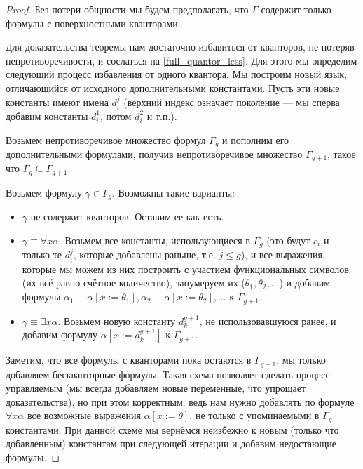\begin{proof}
Без потери общности мы будем предполагать, что $\Gamma$ содержит
только формулы с поверхностными кванторами.

Для доказательства теоремы нам достаточно 
избавиться от кванторов, не потеряв непротиворечивости, и сослаться на
\ref{full_quantor_less}. Для этого мы определим следующий процесс
избавления от одного квантора.
Мы построим новый язык, отличающийся от исходного дополнительными 
константами. Пусть эти новые константы имеют имена $d_i^j$
(верхний индекс означает поколение --- мы сперва добавим константы $d_i^1$,
потом $d_i^2$ и т.п.).

Возьмем непротиворечивое множество формул $\Gamma_g$ и пополним его
дополнительными формулами, получив непротиворечивое множество $\Gamma_{g+1}$,
такое что $\Gamma_g \subseteq \Gamma_{g+1}$. 

Возьмем формулу $\gamma \in \Gamma_g$. Возможны такие варианты:
\begin{itemize}
\item $\gamma$ не содержит кванторов. Оставим ее как есть.

\item $\gamma \equiv \forall x \alpha$.
Возьмем все константы, использующиеся в $\Gamma_g$
(это будут $c_i$ и только те $d_i^j$, которые добавлены раньше, т.е. $j \le g$), и 
все выражения, которые мы можем из них построить с участием функциональных
символов (их всё равно счётное количество), 
занумеруем их ($\theta_1, \theta_2, \dots$) и добавим формулы 
$\alpha_1 \equiv \alpha[x := \theta_1], \alpha_2 \equiv \alpha[x := \theta_2], \dots$ 
к $\Gamma_{g+1}$.

\item $\gamma \equiv \exists x \alpha$.
Возьмем новую константу $d_k^{g+1}$, не использовавшуюся ранее, и 
добавим формулу $\alpha [x := d_k^{g+1}]$ к $\Gamma_{g+1}$.
\end{itemize}

Заметим, что все формулы с кванторами пока остаются в $\Gamma_{g+1}$,
мы только добавляем бескванторные формулы.
Такая схема позволяет сделать процесс управляемым
(мы всегда добавляем новые переменные, что упрощает доказательства),
но при этом корректным: ведь нам нужно добавлять по формуле $\forall x \alpha$
все возможные выражения $\alpha[x := \theta]$, не только 
с упоминаемыми в $\Gamma_g$ константами.
При данной схеме мы вернёмся неизбежно к новым (только что добавленным) 
константам при следующей итерации и добавим недостающие формулы.


\end{proof}
